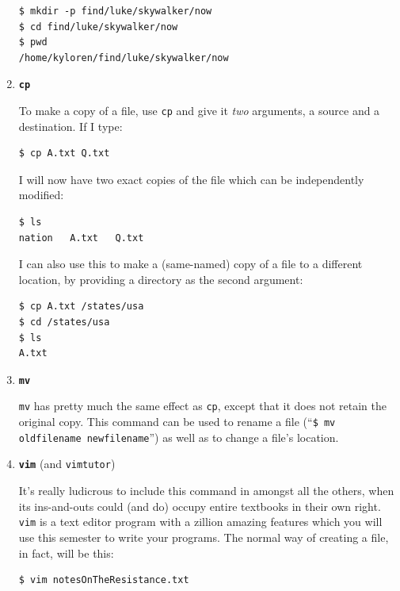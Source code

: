 \begin{enumerate}
\begin{verbatim}
$ mkdir -p find/luke/skywalker/now
$ cd find/luke/skywalker/now
$ pwd
/home/kyloren/find/luke/skywalker/now
\end{verbatim}

\bigline

\item \textbf{\texttt{cp}}

To make a copy of a file, use \texttt{cp} and give it \textit{two} arguments,
a source and a destination. If I type:

\begin{verbatim}
$ cp A.txt Q.txt
\end{verbatim}

I will now have two exact copies of the file which can be independently
modified:

\begin{verbatim}
$ ls
nation   A.txt   Q.txt
\end{verbatim}

I can also use this to make a (same-named) copy of a file to a different
location, by providing a directory as the second argument:

\begin{verbatim}
$ cp A.txt /states/usa
$ cd /states/usa
$ ls
A.txt
\end{verbatim}

\bigline

\item \textbf{\texttt{mv}}

\texttt{mv} has pretty much the same effect as \texttt{cp}, except that it
does not retain the original copy. This command can be used to rename a file
(``\texttt{\$ mv oldfilename newfilename}'') as well as to change a file's
location.

\bigline

\item \textbf{\texttt{vim}} (and \texttt{vimtutor})

It's really ludicrous to include this command in amongst all the others, when
its ins-and-outs could (and do) occupy entire textbooks in their own right.
\texttt{vim} is a text editor program with a zillion amazing features which
you will use this semester to write your programs. The normal way of creating
a file, in fact, will be this:

\begin{verbatim}
$ vim notesOnTheResistance.txt
\end{verbatim}


\end{enumerate}
